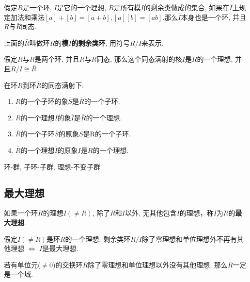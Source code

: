 \begin{Theorem}
假定$R$是一个环, $I$是它的一个理想, $\bar{R}$是所有模$I$的剩余类做成的集合, 如果在$\bar{I}$上规定加法和乘法$[a] + [b] = [a + b], [a][b] = [ab]$.那么$\bar{I}$本身也是一个环, 并且$R$与$\bar{R}$同态.
\end{Theorem}

\begin{Definition}[模$I$的剩余类环]
上面的$\bar{R}$叫做环$R$的\textbf{模$I$的剩余类环}, 用符号$R/I$来表示.
\end{Definition}

\begin{Theorem}
假定$R$与$\bar{R}$是两个环, 并且$R$与$\bar{R}$同态, 那么这个同态满射的核$I$是$R$的一个理想, 并且$R/I \cong \bar{R}$
\end{Theorem}

\begin{Theorem}
在环$R$到环$\bar{R}$的同态满射下:
\begin{enumerate}[(1)]
	\item $R$的一个子环的象$\bar{S}$是$\bar{R}$的一个子环.
	\item $R$的一个理想$I$的象$\bar{I}$是$\bar{R}$的一个理想.
	\item $\bar{R}$的一个子环$\bar{S}$的原象$S$是R的一个子环.
	\item $\bar{R}$的一个理想$\bar{I}$的原象$I$是$R$的一个理想.
\end{enumerate}

\end{Theorem}

\begin{Note}
	环-群, 子环-子群, 理想-不变子群
\end{Note}

\subsection{最大理想}

\begin{Definition}[最大理想]
如果一个环$R$的理想$I (\neq R)$, 除了$R$和$I$以外, 无其他包含$I$的理想，称$I$为$R$的\textbf{最大理想}.
\end{Definition}

\begin{Lemma}
假定$I (\neq R)$是环$R$的一个理想: 剩余类环$R/I$除了零理想和单位理想外不再有其他理想 $\Leftrightarrow$ $I$是最大理想.
\end{Lemma}

\begin{Lemma}
若有单位元($\neq \mathfrak{0}$)的交换环$R$除了零理想和单位理想以外没有其他理想, 那么$R$一定是一个域.
\end{Lemma}

